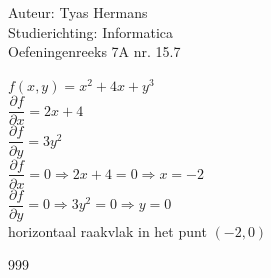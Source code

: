 \documentclass[a4paper]{article}
\begin{document}
  
\noindent \large Auteur: Tyas Hermans \\
\noindent \large Studierichting: Informatica\\
\noindent \large Oefeningenreeks 7A nr. 15.7\\

\medskip

\normalsize

$f(x,y) = x^2 +4x + y^3$\\

$\dfrac{\partial f}{\partial x} = 2x+4$\\

$\dfrac{\partial f}{\partial y} = 3y^2$\\

$\dfrac{\partial f}{\partial x} = 0 \Rightarrow 2x+4 = 0 \Rightarrow x = -2$\\

$\dfrac{\partial f}{\partial y} = 0 \Rightarrow 3y^2 = 0 \Rightarrow y = 0$\\

horizontaal raakvlak in het punt $(-2,0)$\\


\begin{thebibliography}{999}
\end{thebibliography}
\end{document}
